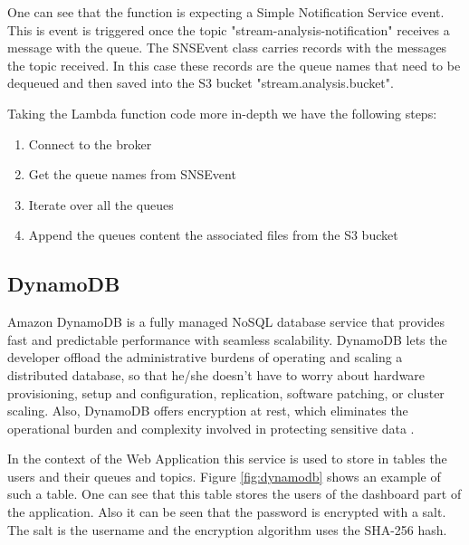 One can see that the function is expecting a Simple Notification Service event. This is event is triggered once the topic "stream-analysis-notification" receives a message with the queue. The SNSEvent class carries records with the messages the topic received. In this case these records are the queue names that need to be dequeued and then saved into the S3 bucket "stream.analysis.bucket".

Taking the Lambda function code more in-depth we have the following steps:

\begin{enumerate}
	\item Connect to the broker
	\item Get the queue names from SNSEvent
	\item Iterate over all the queues
	\item Append the queues content the associated files from the S3 bucket
\end{enumerate}

\newpage

\subsection{DynamoDB}
\label{chap:04:03:08}

Amazon DynamoDB is a fully managed NoSQL database service that provides fast and predictable performance with seamless scalability. DynamoDB lets the developer offload the administrative burdens of operating and scaling a distributed database, so that he/she doesn't have to worry about hardware provisioning, setup and configuration, replication, software patching, or cluster scaling. Also, DynamoDB offers encryption at rest, which eliminates the operational burden and complexity involved in protecting sensitive data \cite{aws-dynamodb}.

In the context of the Web Application this service is used to store in tables the users and their queues and topics. Figure \ref{fig:dynamodb} shows an example of such a table. One can see that this table stores the users of the dashboard part of the application. Also it can be seen that the password is encrypted with a salt. The salt is the username and the encryption algorithm uses the SHA-256 hash.\\

